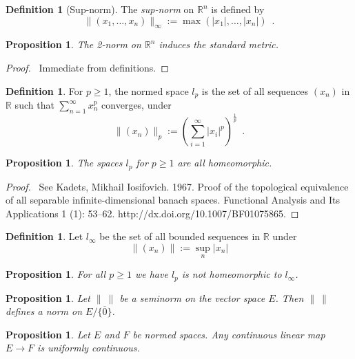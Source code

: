 \documentclass{book}
\let\qed\relax
\newtheorem{prop}[ax]{Proposition}
\theoremstyle{definition}
\newtheorem{df}[ax]{Definition}
\begin{document}
\begin{df}[Sup-norm]
The \emph{sup-norm} on $\mathbb{R}^n$ is defined by
\[ \| (x_1, \ldots, x_n) \|_\infty := \max(|x_1|, \ldots, |x_n|) \enspace . \]
\end{df}

\begin{prop}
The 2-norm on $\mathbb{R}^n$ induces the standard metric.
\end{prop}

\begin{proof}
\pf\ Immediate from definitions. \qed
\end{proof}

\begin{df}
For $p \geq 1$, the normed space $l_p$ is the set of all sequences $(x_n)$ in $\mathbb{R}$ such that $\sum_{n=1}^\infty x_n^p$ converges, under
\[ \| (x_n) \|_p := \left( \sum_{i=1}^\infty |x_i|^p \right)^{\frac{1}{p}} \enspace . \]
\end{df}

\begin{prop}
The spaces $l_p$ for $p \geq 1$ are all homeomorphic.
\end{prop}

\begin{proof}
\pf\ See Kadets, Mikhail Iosifovich. 1967. Proof of the topological equivalence of all separable
infinite-dimensional banach spaces. Functional Analysis and Its Applications 1 (1): 53–62.
http://dx.doi.org/10.1007/BF01075865.
\end{proof}

\begin{df}
Let $l_\infty$ be the set of all bounded sequences in $\mathbb{R}$ under
\[ \| (x_n) \| := \sup_n |x_n| \]
\end{df}

\begin{prop}
For all $p \geq 1$ we have $l_p$ is not homeomorphic to $l_\infty$.
\end{prop}


\begin{prop}
Let $\|\ \|$ be a seminorm on the vector space $E$. Then $\|\ \|$ defines a norm on $E / \overline{\{0\}}$.
\end{prop}

\begin{prop}
Let $E$ and $F$ be normed spaces. Any continuous linear map $E \rightarrow F$ is uniformly continuous.
\end{prop}
\end{document}
